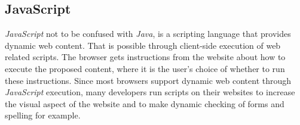 \subsection{JavaScript}
\textit{JavaScript} not to be confused with \textit{Java}, is a scripting language that provides dynamic web content. That is possible through client-side execution of web related scripts. The browser gets instructions from the website about how to execute the proposed content, where it is the user's choice of whether to run these instructions.
Since most browsers support dynamic web content through \textit{JavaScript} execution, many developers run scripts on their websites to increase the visual aspect of the website and to make dynamic checking of forms and spelling for example.\cite{javascript}